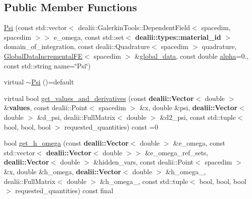 \subsection*{Public Member Functions}
\begin{DoxyCompactItemize}
\item 
\hyperlink{classincremental_f_e_1_1_psi_3_01spacedim_00_01spacedim_01_4_ad6aff88570ea114f34ca92f232759e29}{Psi} (const std\+::vector$<$ dealii\+::\+Galerkin\+Tools\+::\+Dependent\+Field$<$ spacedim, spacedim $>$$>$ e\+\_\+omega, const std\+::set$<$ {\bf dealii\+::types\+::material\+\_\+id} $>$ domain\+\_\+of\+\_\+integration, const dealii\+::\+Quadrature$<$ spacedim $>$ quadrature, \hyperlink{classincremental_f_e_1_1_global_data_incremental_f_e}{Global\+Data\+Incremental\+FE}$<$ spacedim $>$ \&\hyperlink{classincremental_f_e_1_1_psi_3_01spacedim_00_01spacedim_01_4_abf0a4804877fd7cc9bd1b90e52760ba9}{global\+\_\+data}, const double \hyperlink{classincremental_f_e_1_1_psi_3_01spacedim_00_01spacedim_01_4_af7b8227188dbdd6ada35b9445d96c79d}{alpha}=0., const std\+::string name=\char`\"{}Psi\char`\"{})
\item 
virtual \hyperlink{classincremental_f_e_1_1_psi_3_01spacedim_00_01spacedim_01_4_a9e215c6ac92f535204bd35ebe0593125}{$\sim$\+Psi} ()=default
\item 
virtual bool \hyperlink{classincremental_f_e_1_1_psi_3_01spacedim_00_01spacedim_01_4_a17f3559c196edb5487b591bb6061667e}{get\+\_\+values\+\_\+and\+\_\+derivatives} (const {\bf dealii\+::\+Vector}$<$ double $>$ \&{\bf values}, const dealii\+::\+Point$<$ spacedim $>$ \&x, double \&psi, {\bf dealii\+::\+Vector}$<$ double $>$ \&d\+\_\+psi, dealii\+::\+Full\+Matrix$<$ double $>$ \&d2\+\_\+psi, const std\+::tuple$<$ bool, bool, bool $>$ requested\+\_\+quantities) const =0
\item 
bool \hyperlink{classincremental_f_e_1_1_psi_3_01spacedim_00_01spacedim_01_4_ac4ea5fab83e51805dc405517cb35570b}{get\+\_\+h\+\_\+omega} (const {\bf dealii\+::\+Vector}$<$ double $>$ \&e\+\_\+omega, const std\+::vector$<$ {\bf dealii\+::\+Vector}$<$ double $>$$>$ \&e\+\_\+omega\+\_\+ref\+\_\+sets, {\bf dealii\+::\+Vector}$<$ double $>$ \&hidden\+\_\+vars, const dealii\+::\+Point$<$ spacedim $>$ \&x, double \&h\+\_\+omega, {\bf dealii\+::\+Vector}$<$ double $>$ \&h\+\_\+omega\+\_, dealii\+::\+Full\+Matrix$<$ double $>$ \&h\+\_\+omega\+\_, const std\+::tuple$<$ bool, bool, bool $>$ requested\+\_\+quantities) const final
\end{DoxyCompactItemize}
